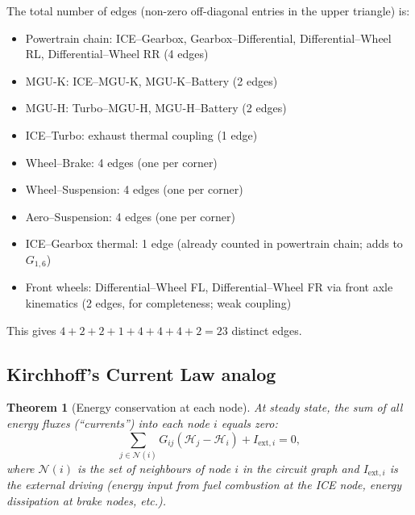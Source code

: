 \documentclass[twocolumn,10pt,a4paper]{article}
\newtheorem{theorem}{Theorem}[section]
\theoremstyle{definition}
\theoremstyle{remark}
\newcommand{\Hcal}{\mathcal{H}}
\begin{document}
The total number of edges (non-zero off-diagonal entries in the upper triangle) is:
\begin{itemize}
    \item Powertrain chain: ICE--Gearbox, Gearbox--Differential, Differential--Wheel RL, Differential--Wheel RR (4 edges)
    \item MGU-K: ICE--MGU-K, MGU-K--Battery (2 edges)
    \item MGU-H: Turbo--MGU-H, MGU-H--Battery (2 edges)
    \item ICE--Turbo: exhaust thermal coupling (1 edge)
    \item Wheel--Brake: 4 edges (one per corner)
    \item Wheel--Suspension: 4 edges (one per corner)
    \item Aero--Suspension: 4 edges (one per corner)
    \item ICE--Gearbox thermal: 1 edge (already counted in powertrain chain; adds to $G_{1,6}$)
    \item Front wheels: Differential--Wheel FL, Differential--Wheel FR via front axle kinematics (2 edges, for completeness; weak coupling)
\end{itemize}

This gives $4 + 2 + 2 + 1 + 4 + 4 + 4 + 2 = 23$ distinct edges.

\subsection{Kirchhoff's Current Law analog}

\begin{theorem}[Energy conservation at each node]\label{thm:kcl}
At steady state, the sum of all energy fluxes (``currents'') into each node $i$ equals zero:
\begin{equation}\label{eq:kcl}
    \sum_{j \in \mathcal{N}(i)} G_{ij} (\Hcal_j - \Hcal_i) + I_{\mathrm{ext},i} = 0,
\end{equation}
where $\mathcal{N}(i)$ is the set of neighbours of node $i$ in the circuit graph and $I_{\mathrm{ext},i}$ is the external driving (energy input from fuel combustion at the ICE node, energy dissipation at brake nodes, etc.).
\end{theorem}
\end{document}
